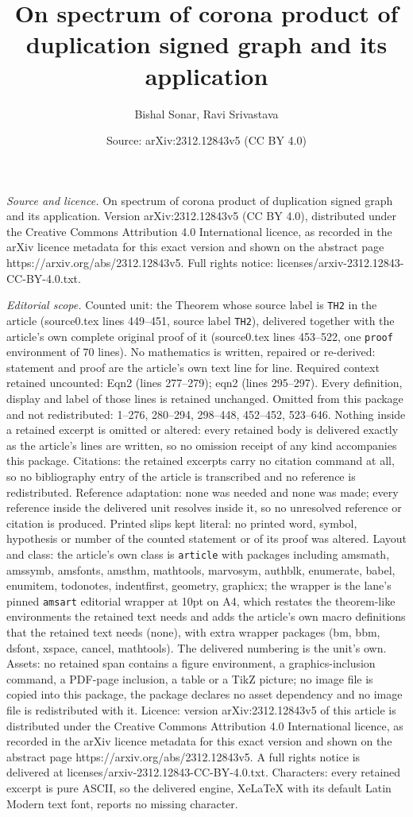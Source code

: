 \documentclass[10pt,a4paper]{amsart}
\title[On spectrum of corona product of duplication signed graph an]{On spectrum of corona product of duplication signed graph and its application}
\author{Bishal Sonar, Ravi Srivastava}
\date{Source: arXiv:2312.12843v5 (CC BY 4.0)}
\begin{document}
\maketitle

\noindent\emph{Source and licence.} On spectrum of corona product of duplication signed graph and its application. Version arXiv:2312.12843v5 (CC BY 4.0), distributed under the Creative Commons Attribution 4.0 International licence, as recorded in the arXiv licence metadata for this exact version and shown on the abstract page https://arxiv.org/abs/2312.12843v5. Full rights notice: licenses/arxiv-2312.12843-CC-BY-4.0.txt.\par\smallskip

\noindent\textit{Editorial scope.} Counted unit: the Theorem whose source label is \texttt{TH2} in the article (source0.tex lines 449--451, source label \texttt{TH2}), delivered together with the article's own complete original proof of it (source0.tex lines 453--522, one \texttt{proof} environment of 70 lines). No mathematics is written, repaired or re-derived: statement and proof are the article's own text line for line. Required context retained uncounted: Eqn2 (lines 277--279); eqn2 (lines 295--297). Every definition, display and label of those lines is retained unchanged. Omitted from this package and not redistributed: 1--276, 280--294, 298--448, 452--452, 523--646. Nothing inside a retained excerpt is omitted or altered: every retained body is delivered exactly as the article's lines are written, so no omission receipt of any kind accompanies this package. Citations: the retained excerpts carry no citation command at all, so no bibliography entry of the article is transcribed and no reference is redistributed. Reference adaptation: none was needed and none was made; every reference inside the delivered unit resolves inside it, so no unresolved reference or citation is produced. Printed slips kept literal: no printed word, symbol, hypothesis or number of the counted statement or of its proof was altered. Layout and class: the article's own class is \texttt{article} with packages including amsmath, amssymb, amsfonts, amsthm, mathtools, marvosym, authblk, enumerate, babel, enumitem, todonotes, indentfirst, geometry, graphicx; the wrapper is the lane's pinned \texttt{amsart} editorial wrapper at 10pt on A4, which restates the theorem-like environments the retained text needs and adds the article's own macro definitions that the retained text needs (none), with extra wrapper packages (bm, bbm, dsfont, xspace, cancel, mathtools). The delivered numbering is the unit's own. Assets: no retained span contains a figure environment, a graphics-inclusion command, a PDF-page inclusion, a table or a TikZ picture; no image file is copied into this package, the package declares no asset dependency and no image file is redistributed with it. Licence: version arXiv:2312.12843v5 of this article is distributed under the Creative Commons Attribution 4.0 International licence, as recorded in the arXiv licence metadata for this exact version and shown on the abstract page https://arxiv.org/abs/2312.12843v5. A full rights notice is delivered at licenses/arxiv-2312.12843-CC-BY-4.0.txt. Characters: every retained excerpt is pure ASCII, so the delivered engine, XeLaTeX with its default Latin Modern text font, reports no missing character.
\end{document}
